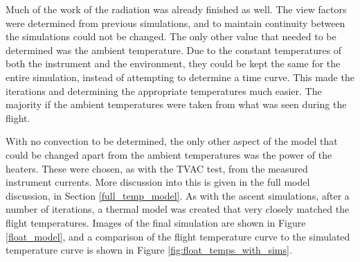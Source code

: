 Much of the work of the radiation was already finished as well. The view factors were determined from previous simulations, and to maintain continuity between the simulations could not be changed. The only other value that needed to be determined was the ambient temperature. Due to the constant temperatures of both the instrument and the environment, they could be kept the same for the entire simulation, instead of attempting to determine a time curve. This made the iterations and determining the appropriate temperatures much easier. The majority if the ambient temperatures were taken from what was seen during the flight. 

With no convection to be determined, the only other aspect of the model that could be changed apart from the ambient temperatures was the power of the heaters. These were chosen, as with the TVAC test, from the measured instrument currents. More discussion into this is given in the full model discussion, in Section \ref{full_temp_model}. As with the ascent simulations, after a number of iterations, a thermal model was created that very closely matched the flight temperatures. Images of the final simulation are shown in Figure \ref{float_model}, and a comparison of the flight temperature curve to the simulated temperature curve is shown in Figure \ref{fig:float_temps_with_sims}.

